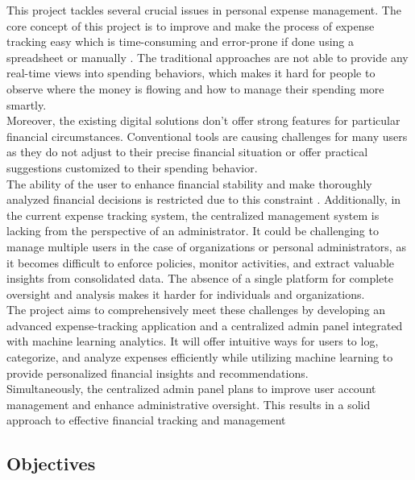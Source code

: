 \documentclass[12pt]{article}
\begin{document}
\normalsize
\noindent This project tackles several crucial issues in personal expense management. The core concept of this project is to improve and make the process of expense tracking easy which is time-consuming and error-prone if done using a spreadsheet or manually \cite{bozkus2009analytical}. The traditional approaches are not able to provide any real-time views into spending behaviors, which makes it hard for people to observe where the money is flowing and how to manage their spending more smartly.\\
Moreover, the existing digital solutions don’t offer strong features for particular financial circumstances. Conventional tools are causing challenges for many users as they do not adjust to their precise financial situation or offer practical suggestions customized to their spending behavior.\\
The ability of the user to enhance financial stability and make thoroughly analyzed financial decisions is restricted due to this constraint \cite{do2023expense}. Additionally, in the current expense tracking system, the centralized management system is lacking from the perspective of an administrator. It could be challenging to manage multiple users in the case of organizations or personal administrators, as it becomes difficult to enforce policies, monitor activities, and extract valuable insights from consolidated data. The absence of a single platform for complete oversight and analysis makes it harder for individuals and organizations.\\
The project aims to comprehensively meet these challenges by developing an advanced expense-tracking application and a centralized admin panel integrated with machine learning analytics. It will offer intuitive ways for users to log, categorize, and analyze expenses efficiently while utilizing machine learning to provide personalized financial insights and recommendations.\\
Simultaneously, the centralized admin panel plans to improve user account management and enhance administrative oversight. This results in a solid approach to effective financial tracking and management \cite{velmurugan2020expense}


\vspace{1cm}

\noindent
\subsection{Objectives}
\end{document}
